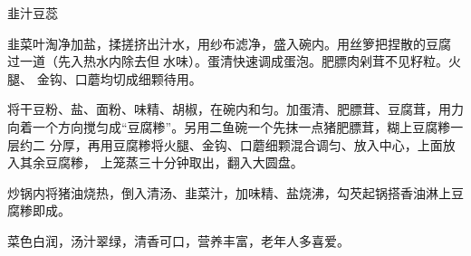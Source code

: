 %
%
%
%
%
%
%
\begin{recipe}{韭汁豆蕊}

\ingredients


\preparation

\step 韭菜叶淘净加盐，揉搓挤出汁水，用纱布滤净，盛入碗内。用丝箩把捏散的豆腐
过一道（先入热水内除去但𥑲水味）。蛋清快速调成蛋泡。肥膘肉剁茸不见籽粒。火腿、
金钩、口蘑均切成细颗待用。

\step 将干豆粉、盐、面粉、味精、胡椒，在碗内和匀。加蛋清、肥膘茸、豆腐茸，用力
向着一个方向搅匀成“豆腐糁”。另用二鱼碗一个先抹一点猪肥膘茸，糊上豆腐糁一层约二
分厚，再用豆腐糁将火腿、金钩、口蘑细颗混合调匀、放入中心，上面放入其余豆腐糁，
上笼蒸三十分钟取出，翻入大圆盘。

\step 炒锅内将猪油烧热，倒入清汤、韭菜汁，加味精、盐烧沸，勾芡起锅搭香油淋上豆
腐糁即成。

\features

菜色白润，汤汁翠绿，清香可口，营养丰富，老年人多喜爱。

\end{recipe}

